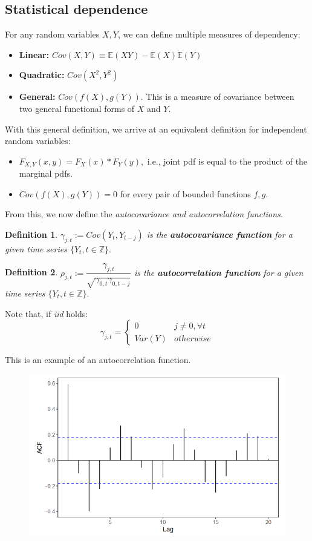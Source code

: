 \documentclass[11pt, a4paper]{report}
\theoremstyle{plain}
\theoremstyle{plain}
\newtheorem{defn}{Definition}[section]
\theoremstyle{remark}
\begin{document}
\subsection{Statistical dependence}

For any random variables $X, Y$, we can define multiple measures of dependency:
\begin{itemize}
	\item \textbf{Linear:} $Cov(X,Y) \equiv \mathbb{E}(XY) - \mathbb{E}(X)\mathbb{E}(Y) $
	\item \textbf{Quadratic:} $Cov(X^2, Y^2)$
	\item \textbf{General:} $Cov(f(X), g(Y))$. This is a measure of covariance between two general functional forms of $X$ and $Y$.
\end{itemize}
With this general definition, we arrive at an equivalent definition for independent random variables:
\begin{itemize}
	\item $F_{X,Y}(x,y) = F_X(x) * F_Y(y),$ i.e., joint pdf is equal to the product of the marginal pdfs.
	\item $Cov(f(X), g(Y)) = 0$ for every pair of bounded functions $f, g$.
\end{itemize}

From this, we now define the \textit{autocovariance and autocorrelation functions.}

\begin{defn}
	$\gamma_{j,t} := Cov(Y_t, Y_{t-j})$ is the \textbf{autocovariance function} for a given time series $\{Y_t, t \in \mathbb{Z} \}.$
\end{defn}

\begin{defn}
	$\rho_{j,t} := \dfrac{\gamma_{j,t}}{\sqrt{\gamma_{0,t}\gamma_{0,t-j}}}$ is the \textbf{autocorrelation function} for a given time series $\{Y_t, t \in \mathbb{Z} \}.$
\end{defn}

Note that, if \textit{iid} holds:
$$ \gamma_{j,t} = \begin{cases}
	0 & j \neq 0, \forall t \\
	Var(Y) & otherwise 
\end{cases} $$

This is an example of an autocorrelation function.

\begin{figure}[h!]
	\centering
	\includegraphics[width=0.6\linewidth]{"acf example"}
	\label{fig:acf-example}
\end{figure}
\end{document}
